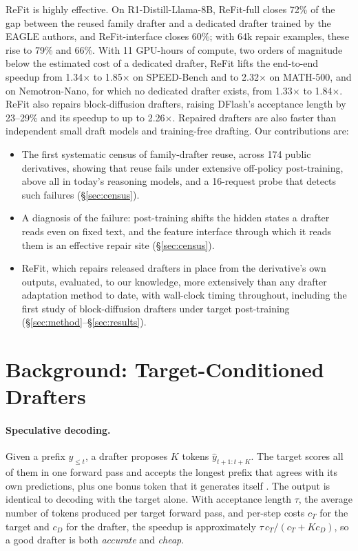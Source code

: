 \documentclass[11pt]{article}
\newcommand{\refit}{ReFit}
\newcommand{\refitI}{ReFit-interface}
\newcommand{\refitF}{ReFit-full}
\begin{document}
\refit{} is highly effective.
On R1-Distill-Llama-8B, \refitF{} closes 72\% of the gap between the reused family drafter and a dedicated drafter trained by the EAGLE authors, and \refitI{} closes 60\%; with 64k repair examples, these rise to 79\% and 66\%.
With 11 GPU-hours of compute, two orders of magnitude below the estimated cost of a dedicated drafter, \refit{} lifts the end-to-end speedup from 1.34$\times$ to 1.85$\times$ on SPEED-Bench and to 2.32$\times$ on MATH-500, and on Nemotron-Nano, for which no dedicated drafter exists, from 1.33$\times$ to 1.84$\times$.
\refit{} also repairs block-diffusion drafters, raising DFlash's acceptance length by 23--29\% and its speedup to up to 2.26$\times$.
Repaired drafters are also faster than independent small draft models and training-free drafting.
Our contributions are:
\begin{itemize}
  \setlength\itemsep{1pt}
  \item The first systematic census of family-drafter reuse, across 174 public derivatives, showing that reuse fails under extensive off-policy post-training, above all in today's reasoning models, and a 16-request probe that detects such failures (\S\ref{sec:census}).
  \item A diagnosis of the failure: post-training shifts the hidden states a drafter reads even on fixed text, and the feature interface through which it reads them is an effective repair site (\S\ref{sec:census}).
  \item \refit{}, which repairs released drafters in place from the derivative's own outputs, evaluated, to our knowledge, more extensively than any drafter adaptation method to date, with wall-clock timing throughout, including the first study of block-diffusion drafters under target post-training (\S\ref{sec:method}--\S\ref{sec:results}).
\end{itemize}

\section{Background: Target-Conditioned Drafters}
\label{sec:background}

\paragraph{Speculative decoding.}
Given a prefix $y_{\le t}$, a drafter proposes $K$ tokens $\hat y_{t+1:t+K}$.
The target scores all of them in one forward pass and accepts the longest prefix that agrees with its own predictions, plus one bonus token that it generates itself \citep{leviathan2023speculative,chen2023accelerating}.
The output is identical to decoding with the target alone.
With acceptance length $\tau$, the average number of tokens produced per target forward pass, and per-step costs $c_T$ for the target and $c_D$ for the drafter, the speedup is approximately $\tau \, c_T / (c_T + K c_D)$, so a good drafter is both \emph{accurate} and \emph{cheap}.
\end{document}
